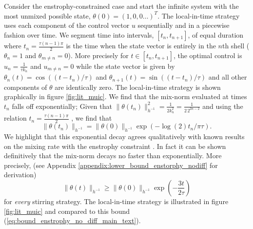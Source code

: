 Consider the enstrophy-constrained case and start the infinite system with the most unmixed possible state, $\theta(0)=(1, 0 , 0 \dots)^{T}$.  The local-in-time strategy uses each component of the control vector $u$ sequentially and in a piecewise fashion over time. We segment time into intervals, $[t_{n},t_{n+1}]$, of equal duration where $t_{n}= \frac{ \tau (n-1) \pi }{2} $ is the time when the state vector is entirely in the $n$th shell ($\theta_n =1$ and $\theta_{m\neq n}=0$). More precisely for $t\in
[t_{n},t_{n+1}]$, the optimal control is  $u_{n}= \frac{1}{\tau k_{n}}$ and $u_{m\neq n} =0$ while the state vector is given by $\theta_{n}(t) =\cos ((t - t_{n})/\tau)$ and $\theta_{n+1}(t) = \sin ((t - t_{n})/\tau) $ and all other components of $\theta$ are identically zero. The local-in-time strategy is shown graphically in figure \ref{fig:lit_muic}. We find that the mix-norm evaluated at times $t_{n}$ falls off exponentially;  Given that $\| \theta (t_{n}) \|^{2}_{h^{-1}}=\frac{1}{2 k_{n}^{2}}=\frac{1}{2  \, 2^{2n-2}}$ and using the relation $t_{n}= \frac{ \tau (n-1) \pi }{2} $ , we find that
\begin{equation}
	\| \theta (t_{n}) \|_{h^{-1}}=\| \theta (0) \|_{h^{-1}}\exp(- \log(2) t_{n} /\pi \tau).
\end{equation}
We highlight that this exponential decay agrees qualitatively with known results on the mixing rate with the enstrophy constraint \cite{GI2014,CS2013,JFM2011,Alberti2014a, Yao2014a}. In fact it can be shown definitively that the mix-norm decays no faster than exponentially. More precisely, (see Appendix \ref{appendix:lower_bound_enstorphy_nodiff} for derivation)
\begin{equation}
	\label{eq:bound_enstrophy_no_diff_main_text}
	\| \theta (t) \|_{h^{-1}} \geq \|\theta (0)\|_{h^{-1}} \exp \left( - \frac{3t}{2\tau} \right)
\end{equation}
for {\it every} stirring strategy.
The local-in-time strategy is illustrated in figure \ref{fig:lit_muic} and compared to this bound (\ref{eq:bound_enstrophy_no_diff_main_text}).

